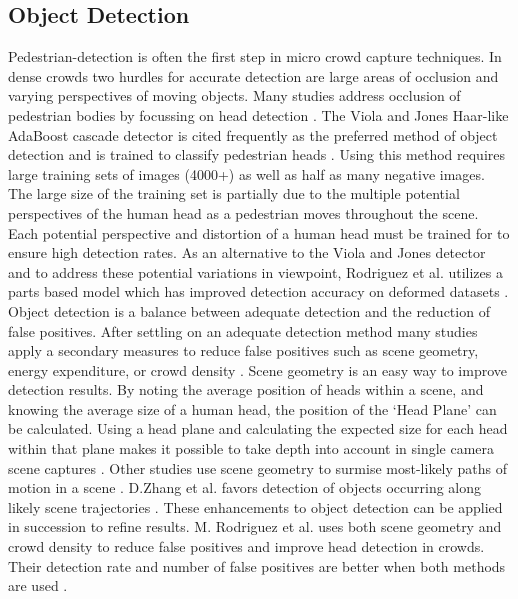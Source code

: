 \documentclass[12pt, onecolumn, conference]{IEEEtran}
\begin{document}
\subsection{Object Detection}

Pedestrian-detection is often the first step in micro crowd capture techniques. In dense crowds two hurdles for accurate detection are large areas of occlusion and varying perspectives of moving objects. Many studies address occlusion of pedestrian bodies by focussing on head detection \cite{M. Rodriguez}\cite{D. Zhang}\cite{I. Ali}\cite{I. Ali2}. The Viola and Jones Haar-like AdaBoost cascade detector is cited frequently as the preferred method of object detection and is trained to classify pedestrian heads \cite{D. Zhang}\cite{I. Ali}\cite{I. Ali2}. Using this method requires large training sets of images (4000+) as well as half as many negative images. The large size of the training set is partially due to the multiple potential perspectives of the human head as a pedestrian moves throughout the scene. Each potential perspective and distortion of a human head must be trained for to ensure high detection rates. As an alternative to the Viola and Jones detector and to address these potential variations in viewpoint, Rodriguez et al. utilizes a parts based model which has improved detection accuracy on deformed datasets \cite{D. Forsyth}.
Object detection is a balance between adequate detection and the reduction of false positives. After settling on an adequate detection method many studies apply a secondary measures to reduce false positives such as scene geometry, energy expenditure, or crowd density \cite{M. Rodriguez}\cite{D. Zhang}\cite{I. Ali}\cite{I. Ali2}. Scene geometry is an easy way to improve detection results. By noting the average position of heads within a scene, and knowing the average size of a human head, the position of the ‘Head Plane’ can be calculated. Using a head plane and calculating the expected size for each head within that plane makes it possible to take depth into account in single camera scene captures \cite{M. Rodriguez}\cite{I. Ali2}.  Other studies use scene geometry to surmise most-likely paths of motion in a scene \cite{M. Rodriguez}\cite{D. Zhang}.  D.Zhang et al. favors detection of objects occurring along likely scene trajectories \cite{D. Zhang}. 
These enhancements to object detection can be applied in succession to refine results. M. Rodriguez et al. uses both scene geometry and crowd density to reduce false positives and improve head detection in crowds. Their detection rate and number of false positives are better when both methods are used \cite{M. Rodriguez}. 
\end{document}
